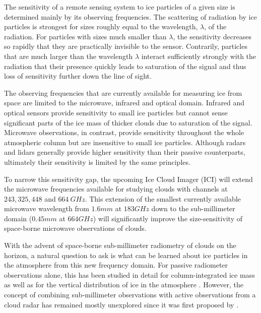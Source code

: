 \documentclass[journal abbreviation, manuscript]{copernicus}
\begin{document}
The sensitivity of a remote sensing system to ice particles of a given size is
determined mainly by its observing frequencies. The scattering of radiation by
ice particles is strongest for sizes roughly equal to the wavelength, $\lambda$,
of the radiation. For particles with sizes much smaller than $\lambda$, the
sensitivity decreases so rapidly that they are practically invisible to the
sensor. Contrarily, particles that are much larger than the wavelength $\lambda$
interact sufficiently strongly with the radiation that their presence quickly
leads to saturation of the signal and thus loss of sensitivity further down the
line of sight.

The observing frequencies that are currently available for measuring ice from
space are limited to the microwave, infrared and optical domain. Infrared and
optical sensors provide sensitivity to small ice particles but cannot sense
significant parts of the ice mass of thicker clouds due to saturation of the
signal. Microwave observations, in contrast, provide sensitivity throughout the
whole atmospheric column but are insensitive to small ice particles. Although
radars and lidars generally provide higher sensitivity than their passive
counterparts, ultimately their sensitivity is limited by the same principles.

To narrow this sensitivity gap, the upcoming Ice Cloud Imager (ICI) will extend
the microwave frequencies available for studying clouds with channels at $243,
325, 448$ and $664\ \unit{GHz}$. This extension of the smallest currently
available microwave wavelength from $1.6\unit{mm}$ at $183\unit{GHz}$ down to
the sub-millimeter domain ($0.45\unit{mm}$ at $664\unit{GHz}$) will
significantly improve the size-sensitivity of space-borne microwave observations
of clouds.

With the advent of space-borne sub-millimeter radiometry of clouds on the
horizon, a natural question to ask is what can be learned about ice particles in
the atmosphere from this new frequency domain. For passive radiometer
observations alone, this has been studied in detail for column-integrated ice
mass \citep{jimenez07, wang17, brath18a} as well as for the vertical
distribution of ice in the atmosphere \citep{grutzun18, aires19}. However, the
concept of combining sub-millimeter observations with active observations from a
cloud radar has remained mostly unexplored since it was first proposed by
\cite{evans05}.
\end{document}
